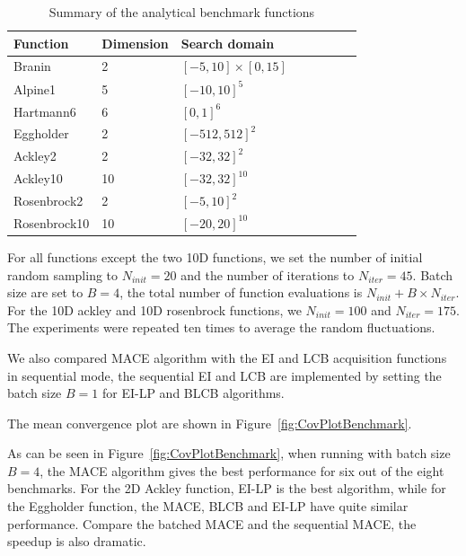 \begin{table}[htbp]
    \centering
    \caption{Summary of the analytical benchmark functions}
    \label{tab:summaryanalygical}
    \begin{tabular}{llllllll}
        \toprule
         Function           & Dimension        & Search domain             \\ \midrule
         Branin             & 2                & $[-5,  10]\times[0, 15]$  \\
         Alpine1            & 5                & $[-10, 10]^5$             \\
         Hartmann6          & 6                & $[0,   1]^6$              \\
         Eggholder          & 2                & $[-512, 512]^2$           \\
         Ackley2            & 2                & $[-32, 32]^2$             \\
         Ackley10           & 10               & $[-32, 32]^{10}$          \\
         Rosenbrock2        & 2                & $[-5,  10]^2$             \\
         Rosenbrock10       & 10               & $[-20, 20]^{10}$          \\
        \bottomrule
    \end{tabular}
\end{table}

For all functions except the two 10D functions, we set the number of initial
random sampling to $N_{init} = 20$ and the number of iterations to $N_{iter} =
45$. Batch size are set to $B = 4$, the total number of function evaluations is
$N_{init} + B \times N_{iter}$. For the 10D ackley and 10D rosenbrock functions, we
$N_{init} = 100$ and $N_{iter} = 175$. The experiments were repeated ten
times to average the random fluctuations. 

We also compared MACE algorithm with the EI and LCB acquisition functions in
sequential mode, the sequential EI and LCB are implemented by setting the batch
size $B = 1$ for EI-LP and BLCB algorithms.

The mean convergence plot are shown in Figure~\ref{fig:CovPlotBenchmark}.


As can be seen in Figure~\ref{fig:CovPlotBenchmark}, when running with batch
size $B = 4$, the MACE algorithm gives the best performance for six out of the
eight benchmarks. For the 2D Ackley function, EI-LP is the best algorithm,
while for the Eggholder function, the MACE, BLCB and EI-LP have quite similar
performance. Compare the batched MACE and the sequential MACE, the speedup is
also dramatic.

